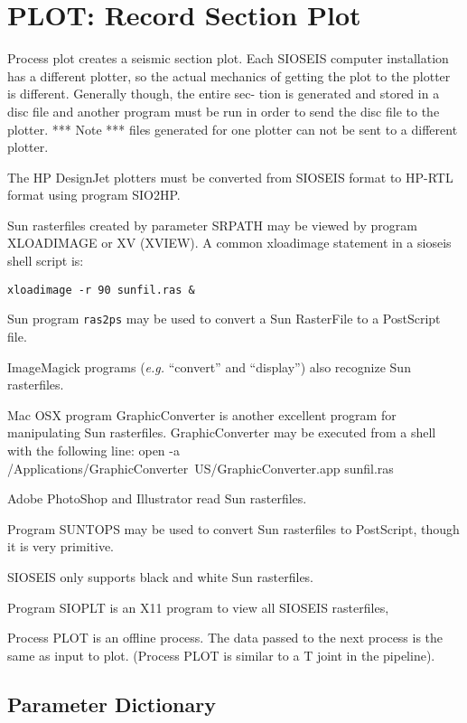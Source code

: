 \section{PLOT: Record Section Plot}
\label{cmd_plot}

Process plot creates a seismic section plot.  Each SIOSEIS computer
installation has a different plotter, so the actual mechanics of getting
the plot to the plotter is different.  Generally though, the entire sec-
tion is generated and stored in a disc file and another program must be
run in order to send the disc file to the plotter.  ***  Note  *** files
generated for one plotter can not be sent to a different plotter.

The HP DesignJet plotters must be converted from SIOSEIS format to
HP-RTL format using program SIO2HP.

Sun rasterfiles created by parameter SRPATH may be viewed by
program XLOADIMAGE or XV (XVIEW).  A common xloadimage statement
in a sioseis shell script is:
\begin{verbatim}
xloadimage -r 90 sunfil.ras &
\end{verbatim}

Sun program \texttt{ras2ps} may be used to convert a Sun RasterFile to a
PostScript file.

ImageMagick programs (\textit{e.g.} ``convert'' and ``display'') also recognize Sun
rasterfiles.

Mac OSX program GraphicConverter is another excellent program for
manipulating Sun rasterfiles.  GraphicConverter may be executed from
a shell with the following line:
open -a /Applications/GraphicConverter\ US/GraphicConverter.app sunfil.ras

Adobe PhotoShop and Illustrator read Sun rasterfiles.

Program SUNTOPS may be used to convert Sun rasterfiles to PostScript,
though it is very primitive.

SIOSEIS only supports black and white Sun rasterfiles.

Program SIOPLT is an X11 program to view all SIOSEIS rasterfiles,

Process PLOT is an offline process.  The data passed to the next process
is the same as input to plot.  (Process PLOT is similar to a T joint in
the pipeline).

\subsection{Parameter Dictionary}

